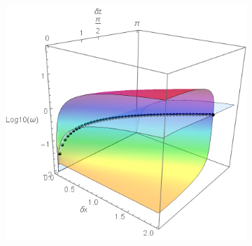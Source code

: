 \documentclass[a4paper,11pt]{article}
\begin{document}
\begin{figure}[!h]
\begin{subfigure}{0.45\linewidth}
		\includegraphics[width=1\linewidth]{FIGURES/Fig_Inter_Imag.png}
		\caption{}
	\end{subfigure}
	

\end{figure}
\end{document}
